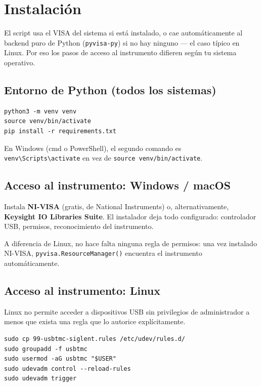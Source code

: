 \documentclass[11pt,a4paper]{article}
\begin{document}
\section{Instalación}
El script usa el VISA del sistema si está instalado, o cae automáticamente
al backend puro de Python (\texttt{pyvisa-py}) si no hay ninguno --- el caso
típico en Linux. Por eso los pasos de acceso al instrumento difieren según
tu sistema operativo.

\subsection{Entorno de Python (todos los sistemas)}
\begin{lstlisting}
python3 -m venv venv
source venv/bin/activate
pip install -r requirements.txt
\end{lstlisting}
En Windows (cmd o PowerShell), el segundo comando es
\texttt{venv\textbackslash Scripts\textbackslash activate} en vez de
\texttt{source venv/bin/activate}.

\subsection{Acceso al instrumento: Windows / macOS}
Instala \textbf{NI-VISA} (gratis, de National Instruments) o, alternativamente,
\textbf{Keysight IO Libraries Suite}. El instalador deja todo configurado:
controlador USB, permisos, reconocimiento del instrumento.

\begin{nota}[title=Sin pasos adicionales]
A diferencia de Linux, no hace falta ninguna regla de permisos: una vez
instalado NI-VISA, \texttt{pyvisa.ResourceManager()} encuentra el
instrumento automáticamente.
\end{nota}

\subsection{Acceso al instrumento: Linux}
Linux no permite acceder a dispositivos USB sin privilegios de administrador
a menos que exista una regla que lo autorice explícitamente.

\begin{lstlisting}
sudo cp 99-usbtmc-siglent.rules /etc/udev/rules.d/
sudo groupadd -f usbtmc
sudo usermod -aG usbtmc "$USER"
sudo udevadm control --reload-rules
sudo udevadm trigger
\end{lstlisting}
\end{document}
